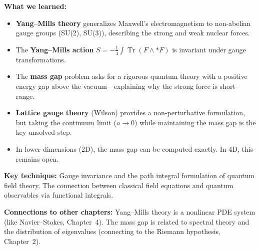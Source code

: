 \noindent\textbf{What we learned:}
\begin{itemize}
  \item \textbf{Yang--Mills theory} generalizes Maxwell's electromagnetism to non-abelian gauge groups (SU(2), SU(3)), describing the strong and weak nuclear forces.
  \item The \textbf{Yang--Mills action} $S = -\frac{1}{4}\int \operatorname{Tr}(F \wedge *F)$ is invariant under gauge transformations.
  \item The \textbf{mass gap} problem asks for a rigorous quantum theory with a positive energy gap above the vacuum---explaining why the strong force is short-range.
  \item \textbf{Lattice gauge theory} (Wilson) provides a non-perturbative formulation, but taking the continuum limit ($a \to 0$) while maintaining the mass gap is the key unsolved step.
  \item In lower dimensions (2D), the mass gap can be computed exactly. In 4D, this remains open.
\end{itemize}

\noindent\textbf{Key technique:} Gauge invariance and the path integral formulation of quantum field theory. The connection between classical field equations and quantum observables via functional integrals.

\noindent\textbf{Connections to other chapters:} Yang--Mills theory is a nonlinear PDE system (like Navier--Stokes, Chapter~4). The mass gap is related to spectral theory and the distribution of eigenvalues (connecting to the Riemann hypothesis, Chapter~2).
